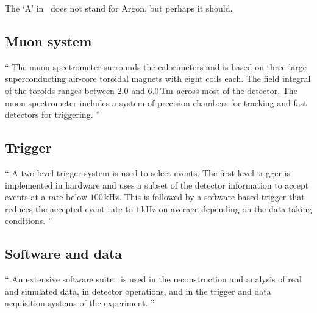 The `A' in \atlas\ does not stand for Argon, but perhaps it should.


\subsection{Muon system}
\label{sec:atlas_muon}
\begin{displayquote}
``%
The muon spectrometer surrounds the calorimeters and is based on three large
superconducting air-core toroidal magnets with eight coils each.
The field integral of the toroids ranges between $2.0$ and
$6.0\,\mathrm{T\kern-0.15ex m}$ across most of the detector.
The muon spectrometer includes a system of precision chambers for tracking and
fast detectors for triggering.%
''~\cite{atlas2022searches}
\end{displayquote}


\subsection{Trigger}
\label{sec:atlas_trigger}
\begin{displayquote}
``%
A two-level trigger system is used to select events.
The first-level trigger is implemented in hardware and uses a subset of the
detector information to accept events at a rate below $100\,\mathrm{kHz}$.
This is followed by a software-based trigger that reduces the accepted event
rate to $1\,\mathrm{kHz}$ on average depending on the data-taking conditions.%
''~\cite{atlas2022searches}
\end{displayquote}


\subsection{Software and data}
\label{sec:atlas_software_data}
\begin{displayquote}
``%
An extensive software suite~\cite{ATL-SOFT-PUB-2021-001} is used in the
reconstruction and analysis of real and simulated data, in detector operations,
and in the trigger and data acquisition systems of the experiment.%
''~\cite{atlas2022searches}
\end{displayquote}



